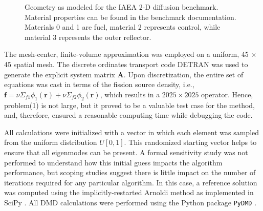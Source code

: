 \begin{figure}[htb!]
\caption{Geometry as modeled for the IAEA 2-D diffusion benchmark.  Material properties can be found in the benchmark documentation.  Materials 0 and 1 are fuel, material 2 represents control, while material 3 represents the outer reflector.}
\label{fig:IAEA}
\end{figure}

The mesh-center, finite-volume approximation was employed on a uniform, 45 $\times$ 45 spatial mesh.
The discrete ordinates transport code DETRAN was used to generate the explicit system matrix $\mathbf{A}$.
Upon discretization, the entire set of equations was cast in terms of the fission source density, i.e., $\mathbf{f} = \nu\Sigma_{f1}\phi_1(\mathbf{r}) + \nu\Sigma_{f2}\phi_2(\mathbf{r})$, which results in a $2025 \times 2025$ operator. 
Hence, problem(1) is not large, but it proved to be a valuable test case for the method, and, therefore, ensured a reasonable computing time while debugging the code.


All calculations were initialized with a vector in which each element was sampled from the uniform distribution $U[0, 1]$. 
This randomized starting vector helps to ensure that all eigenmodes can be present.
A formal sensitivity study was not performed to understand how this initial guess impacts the algorithm performance, but scoping studies suggest there is little impact on the number of iterations required for any particular algorithm.
In this case, a reference solution was computed using the implicitly-restarted Arnoldi method as implemented in SciPy \cite{scipy}.
All DMD calculations were performed using the Python package {\tt PyDMD} \cite{pydmd}.

